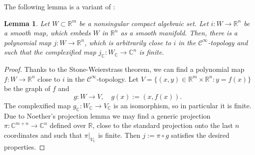 \documentclass{amsart}
\theoremstyle{plain}
\newtheorem{lem}[thm]{Lemma}
\theoremstyle{definition}
\theoremstyle{remark}
\numberwithin{equation}{thm} %
\newcommand{\R}{\mathbb{R}}
\newcommand{\C}{\mathbb{C}}
\begin{document}
The following lemma is a variant of \cite[Lemma 6]{akbulutApproximatingSubmanifoldsAlgebraic1992}:
\begin{lem}\label{lem1}
Let $W\subset \R^m$ be a nonsingular compact algebraic set. Let $i:W\rightarrow \R^n$ be a smooth map, which embeds $W$ in $\R^n$ as a smooth manifold. Then, there is a polynomial map $j:W\rightarrow \R^n$, which is arbitrarily close to $i$ in the $\mathcal C^\infty$-topology and such that the complexified map $j_\C:W_\C\rightarrow \C^n$ is finite.
\end{lem}
\begin{proof}
Thanks to the Stone-Weierstrass theorem, we can find a polynomial map $f:W\rightarrow \R^n$ close to $i$ in the $\mathcal C^\infty$-topology. Let $V=\{(x,y)\in \R^m \times \R^n:y=f(x)\}$ be the graph of $f$ and 
\begin{equation*}
    g:W\rightarrow V,\quad g(x):=(x,f(x)).
\end{equation*}
The complexified map $g_\C:W_\C\rightarrow V_\C$ is an isomorphism, so in particular it is finite. Due to Noether's projection lemma we may find a generic projection $\pi:\C^{m+n}\rightarrow \C^n$ defined over $\R$, close to the standard projection onto the last $n$ coordinates and such that $\pi\vert_{V_\C}$ is finite. Then $j:=\pi\circ g$ satisfies the desired properties.
\end{proof}
\end{document}
